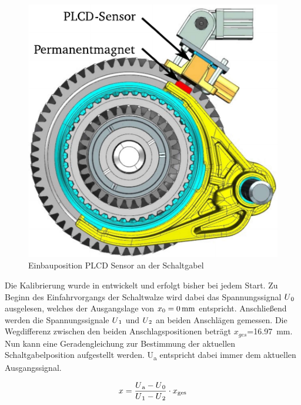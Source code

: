 \begin{figure}[h]
	\centering
		\includegraphics{Bilder/Sensor.pdf}
	\caption{Einbauposition PLCD Sensor an der Schaltgabel \cite[S.14]{adp}}
	\label{fig:Sensor}
\end{figure}
Die Kalibrierung wurde in \cite[S.24f]{messtechnik} entwickelt und erfolgt bisher bei jedem Start. Zu Beginn des Einfahrvorgangs der Schaltwalze wird dabei das Spannungssignal $U\textsubscript{0}$ ausgelesen, welches der Ausgangslage von $x\textsubscript{0}=\SI{0}{mm}$ entspricht. Anschließend werden die Spannungssignale $U\textsubscript{1}$ und $U\textsubscript{2}$ an beiden Anschlägen gemessen. Die Wegdifferenz zwischen den beiden Anschlagspositionen beträgt $x_{ges}$=\SI{16,97}{mm}. Nun kann eine Geradengleichung zur Bestimmung der aktuellen Schaltgabelposition aufgestellt werden. U\textsubscript{a} entspricht dabei immer dem aktuellen Ausgangssignal.

\begin{equation}\label{eq:Lage}
	x=\frac{U\textsubscript{a} -U\textsubscript{0}}{U\textsubscript{1}-U\textsubscript{2}}\cdot x\textsubscript{ges}
\end{equation}
 

